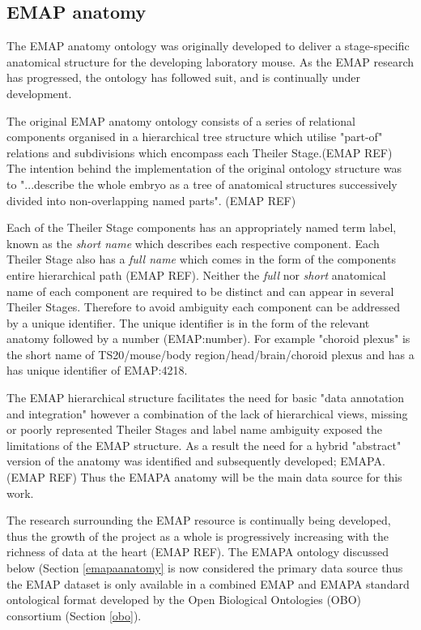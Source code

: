 \subsection{EMAP anatomy}
The EMAP anatomy ontology was originally developed to deliver a stage-specific anatomical structure for the developing laboratory mouse. As the EMAP research has progressed, the ontology has followed suit, and is continually under development.

The original EMAP anatomy ontology consists of a series of relational components organised in a hierarchical tree structure which utilise "part-of" relations and subdivisions which encompass each Theiler Stage.(EMAP REF) The intention behind the implementation of the original ontology structure was to "...describe the whole embryo as a tree of anatomical structures successively divided into non-overlapping named parts". (EMAP REF)

Each of the Theiler Stage components has an appropriately named term label, known as the \textit{short name} which describes each respective component. Each Theiler Stage also has a \textit{full name} which comes in the form of the components entire hierarchical path (EMAP REF). Neither the \textit{full} nor \textit{short} anatomical name of each component are required to be distinct and can appear in several Theiler Stages. Therefore to avoid ambiguity each component can be addressed by a unique identifier. The unique identifier is in the form of the relevant anatomy followed by a number (EMAP:number). For example "choroid plexus" is the short name of TS20/mouse/body region/head/brain/choroid plexus and has a has unique identifier of EMAP:4218.

The EMAP hierarchical structure facilitates the need for basic "data annotation and integration" however a combination of the lack of hierarchical views, missing or poorly represented Theiler Stages and label name ambiguity exposed the limitations of the EMAP structure. As a result the need for a hybrid "abstract" version of the anatomy was identified and subsequently developed; EMAPA. (EMAP REF) Thus the EMAPA anatomy will be the main data source for this work.

The research surrounding the EMAP resource is continually being developed, thus the growth of the project as a whole is progressively increasing with the richness of data at the heart (EMAP REF). The EMAPA ontology discussed below (Section \ref{emapaanatomy} is now considered the primary data source thus the EMAP dataset is only available in a combined EMAP and EMAPA standard ontological format developed by the Open Biological Ontologies (OBO) consortium (Section \ref{obo}).



